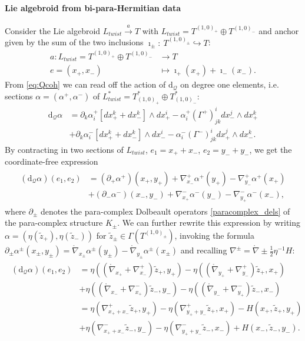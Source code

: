 \documentclass{article}
\newcommand{\QQ}{\mathcal{Q}}
\newcommand{\lc}{\mathring{\n}}
\newcommand{\ap}{\alpha}
\def\w{\wedge}
\newcommand{\p}{\partial}
\newcommand{\n}{\nabla}
\newcommand{\rd}{\mathrm{d}}
\newcommand{\se}{\Gamma}
\newcommand{\zt}{\tl{z}}
\def\tl{\tilde}
\theoremstyle{definition}
\theoremstyle{remark}
\begin{document}
\paragraph{Lie algebroid from bi-para-Hermitian data} 
Consider the Lie algebroid $L_{twist}\overset{a}{\rightarrow} T$ with $L_{twist}=T^{(1,0)_+}\oplus T^{(1,0)_-}$ and anchor given by the sum of the two inclusions $\imath_\pm:\ T^{(1,0)_\pm}\hookrightarrow T$:
\begin{align*}
a:L_{twist}=T^{(1,0)_+}\oplus T^{(1,0)_-} &\rightarrow T\\
 e=(x_+,x_-) &\mapsto \imath_+(x_+)+\imath_-(x_-).
\end{align*}
From \eqref{eq:Qcoh} we can read off the action of $\rd_\QQ$ on degree one elements, i.e. sections $\alpha=(\alpha^+,\alpha^-)$ of $L^*_{twist}=T^*_{(1,0)_+}\oplus T^*_{(1,0)_-}$:
\begin{align*}
\rd_\QQ\alpha&=\p_k\ap_i^+[dx_+^k+dx_-^k]\w dx_+^i-\ap^+_i(\Gamma^+)^i_{jk}dx_-^j\w dx_+^k\\
&+\p_k\ap_i^-[dx_+^k+dx_-^k]\w dx_-^i-\ap^-_i(\Gamma^-)^i_{jk}dx_+^j\w dx_-^k.
\end{align*}
By contracting in two sections of $L_{twist}$, $e_1=x_++x_-$, $e_2=y_-+y_-$, we get the coordinate-free expression
\begin{align}\label{eq:dQ}
\begin{aligned}
(\rd_\QQ\ap)(e_1,e_2)&=(\p_+\ap^+)(x_+,y_+)+\n^+_{x_-}\ap^+(y_+)-\n^+_{y_-}\ap^+(x_+)\\
&+(\p_-\ap^-)(x_-,y_-)+\n^-_{x_+}\ap^-(y_-)-\n^-_{y_+}\ap^-(x_-),
\end{aligned}
\end{align}
where $\p_\pm$ denotes the para-complex Dolbeault operators \eqref{paracomplex_dels} of the para-complex structure $K_\pm$. We can further rewrite this expression by writing $\ap=(\eta(\tl{z}_+),\eta(\tl{z}_-))$ for $\tl{z}_\pm \in \se(T^{(1,0)_\pm})$, invoking the formula $\p_\pm\ap^\pm(x_\pm,y_\pm)=\lc_{x_\pm}\ap^\pm(y_\pm)-\lc_{y_\pm}\ap^\pm(x_\pm)$ and recalling $\n^\pm=\lc\pm \frac{1}{2}\eta^{-1}H$:
\begin{align}
\begin{aligned}
(\rd_\QQ\ap)(e_1,e_2)&=\eta((\lc_{x_+}+\n_{x_-}^+)\zt_+,y_+)-\eta((\lc_{y_+}+\n_{y_-}^+)\zt_+,x_+)\\
&+\eta((\lc_{x_-}+\n_{x_+}^-)\zt_-,y_-)-\eta((\lc_{y_-}+\n_{y_+}^-)\zt_-,x_-)\\
&=\eta(\n^+_{x_++x_-}\zt_+,y_+)-\eta(\n_{y_++y_-}^+\zt_+,x_+)-H(x_+,\zt_+,y_+)\\
&+\eta(\n_{x_++x_-}^-\zt_-,y_-)-\eta(\n_{y_++y_-}^-\zt_-,x_-)+H(x_-,\zt_-,y_-).
\end{aligned}
\end{align}
\end{document}
